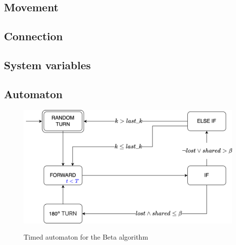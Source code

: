 \subsection{Movement}



\subsection{Connection}



\subsection{System variables}



\subsection{Automaton}

\begin{figure}[H]
\caption{Timed automaton for the Beta algorithm}
\includegraphics[width=\textwidth]{images/beta.png}
\label{fig:automaton}
\end{figure}
